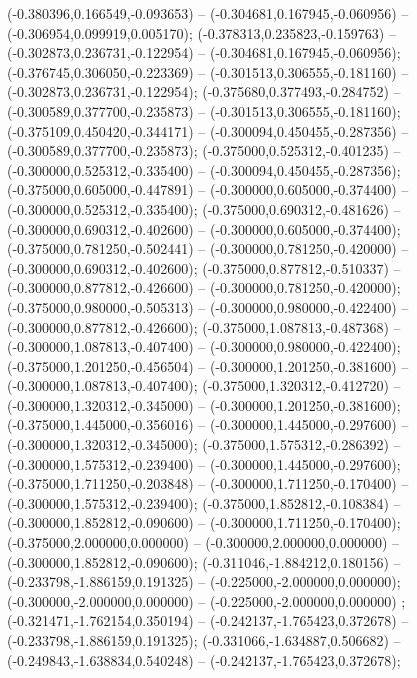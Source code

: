  (-0.380396,0.166549,-0.093653) -- (-0.304681,0.167945,-0.060956) -- (-0.306954,0.099919,0.005170);
 (-0.378313,0.235823,-0.159763) -- (-0.302873,0.236731,-0.122954) -- (-0.304681,0.167945,-0.060956);
 (-0.376745,0.306050,-0.223369) -- (-0.301513,0.306555,-0.181160) -- (-0.302873,0.236731,-0.122954);
 (-0.375680,0.377493,-0.284752) -- (-0.300589,0.377700,-0.235873) -- (-0.301513,0.306555,-0.181160);
 (-0.375109,0.450420,-0.344171) -- (-0.300094,0.450455,-0.287356) -- (-0.300589,0.377700,-0.235873);
 (-0.375000,0.525312,-0.401235) -- (-0.300000,0.525312,-0.335400) -- (-0.300094,0.450455,-0.287356);
 (-0.375000,0.605000,-0.447891) -- (-0.300000,0.605000,-0.374400) -- (-0.300000,0.525312,-0.335400);
 (-0.375000,0.690312,-0.481626) -- (-0.300000,0.690312,-0.402600) -- (-0.300000,0.605000,-0.374400);
 (-0.375000,0.781250,-0.502441) -- (-0.300000,0.781250,-0.420000) -- (-0.300000,0.690312,-0.402600);
 (-0.375000,0.877812,-0.510337) -- (-0.300000,0.877812,-0.426600) -- (-0.300000,0.781250,-0.420000);
 (-0.375000,0.980000,-0.505313) -- (-0.300000,0.980000,-0.422400) -- (-0.300000,0.877812,-0.426600);
 (-0.375000,1.087813,-0.487368) -- (-0.300000,1.087813,-0.407400) -- (-0.300000,0.980000,-0.422400);
 (-0.375000,1.201250,-0.456504) -- (-0.300000,1.201250,-0.381600) -- (-0.300000,1.087813,-0.407400);
 (-0.375000,1.320312,-0.412720) -- (-0.300000,1.320312,-0.345000) -- (-0.300000,1.201250,-0.381600);
 (-0.375000,1.445000,-0.356016) -- (-0.300000,1.445000,-0.297600) -- (-0.300000,1.320312,-0.345000);
 (-0.375000,1.575312,-0.286392) -- (-0.300000,1.575312,-0.239400) -- (-0.300000,1.445000,-0.297600);
 (-0.375000,1.711250,-0.203848) -- (-0.300000,1.711250,-0.170400) -- (-0.300000,1.575312,-0.239400);
 (-0.375000,1.852812,-0.108384) -- (-0.300000,1.852812,-0.090600) -- (-0.300000,1.711250,-0.170400);
 (-0.375000,2.000000,0.000000) -- (-0.300000,2.000000,0.000000) -- (-0.300000,1.852812,-0.090600);
 (-0.311046,-1.884212,0.180156) -- (-0.233798,-1.886159,0.191325) -- (-0.225000,-2.000000,0.000000);
 (-0.300000,-2.000000,0.000000) -- (-0.225000,-2.000000,0.000000) ;
 (-0.321471,-1.762154,0.350194) -- (-0.242137,-1.765423,0.372678) -- (-0.233798,-1.886159,0.191325);
 (-0.331066,-1.634887,0.506682) -- (-0.249843,-1.638834,0.540248) -- (-0.242137,-1.765423,0.372678);
